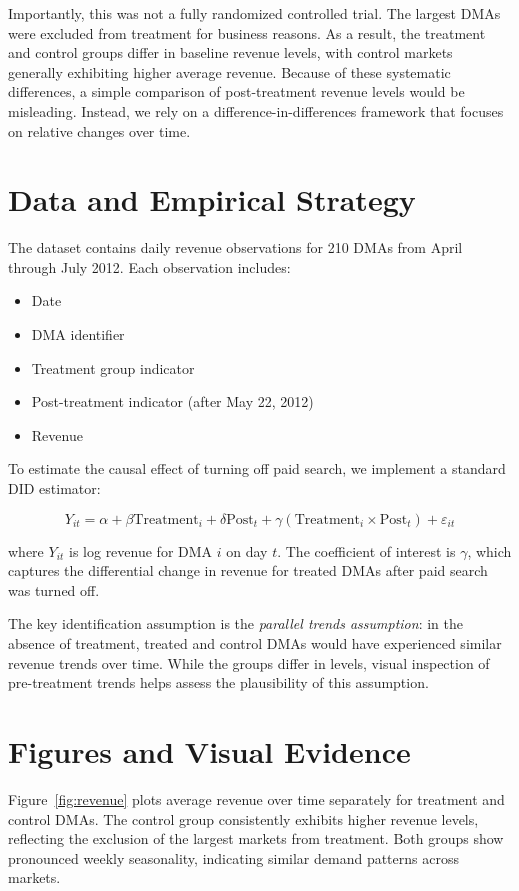 \documentclass[12pt]{article}
\begin{document}
	Importantly, this was not a fully randomized controlled trial. The largest DMAs were excluded from treatment for business reasons. As a result, the treatment and control groups differ in baseline revenue levels, with control markets generally exhibiting higher average revenue. Because of these systematic differences, a simple comparison of post-treatment revenue levels would be misleading. Instead, we rely on a difference-in-differences framework that focuses on relative changes over time.
	
	\section{Data and Empirical Strategy}
	
	The dataset contains daily revenue observations for 210 DMAs from April through July 2012. Each observation includes:
	\begin{itemize}
		\item Date
		\item DMA identifier
		\item Treatment group indicator
		\item Post-treatment indicator (after May 22, 2012)
		\item Revenue
	\end{itemize}
	
	To estimate the causal effect of turning off paid search, we implement a standard DID estimator:
	
	\[
	Y_{it} = \alpha + \beta \text{Treatment}_i + \delta \text{Post}_t + 
	\gamma (\text{Treatment}_i \times \text{Post}_t) + \varepsilon_{it}
	\]
	
	where $Y_{it}$ is log revenue for DMA $i$ on day $t$. The coefficient of interest is $\gamma$, which captures the differential change in revenue for treated DMAs after paid search was turned off.
	
	The key identification assumption is the \textit{parallel trends assumption}: in the absence of treatment, treated and control DMAs would have experienced similar revenue trends over time. While the groups differ in levels, visual inspection of pre-treatment trends helps assess the plausibility of this assumption.
	
	\section{Figures and Visual Evidence}
	
	Figure~\ref{fig:revenue} plots average revenue over time separately for treatment and control DMAs. The control group consistently exhibits higher revenue levels, reflecting the exclusion of the largest markets from treatment. Both groups show pronounced weekly seasonality, indicating similar demand patterns across markets.
	
\end{document}
